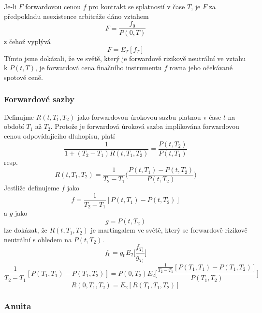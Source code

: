 \documentclass[a4paper]{book}
\begin{document}
Je-li $F$ forwardovou cenou $f$ pro kontrakt se splatností v čase $T$, je $F$ za předpokladu neexistence arbitráže dáno vztahem
\begin{equation*}
F = \frac{f_0}{P(0,T)}
\end{equation*}
z čehož vyplývá
\begin{equation*}
F = E_T[f_T]
\end{equation*}
Tímto jsme dokázali, že ve světě, který je forwardově rizikově neutrální ve vztahu k $P(t,T)$, je forwardová cena finačního instrumentu $f$ rovna jeho očekávané spotové ceně.\\

\subsubsection{Forwardové sazby}

Definujme $R(t,T_1,T_2)$ jako forwardovou úrokovou sazbu platnou v čase $t$ na období $T_1$ až $T_2$. Protože je forwardová úroková sazba implikována forwardovou cenou odpovídajícího dluhopisu, platí
\begin{equation*}
\frac{1}{1+(T_2 - T_1)R(t,T_1, T_2)}=\frac{P(t,T_2)}{P(t,T_1)}
\end{equation*}
resp.
\begin{equation*}
R(t, T_1, T_2) = \frac{1}{T_2 - T_1} \Bigg( \frac{P(t, T_1)-P(t, T_2)}{P(t, T_2)}\Bigg)
\end{equation*}
Jestliže definujeme $f$ jako
\begin{equation*}
f = \frac{1}{T_2 - T_1}[P(t,T_1) - P(t, T_2)]
\end{equation*}
a $g$ jako
\begin{equation*}
g = P(t,T_2)
\end{equation*}
lze dokázat, že $R(t,T_1,T_2)$ je martingalem ve světě, který se forwardově rizikově neutrální s ohledem na $P(t,T_2)$.
\begin{equation*}
f_0 = g_0 E_2 \Bigg[ \frac{f_{T_1}}{g_{T_1}}\Bigg]
\end{equation*}
\begin{equation*}
\frac{1}{T_2 - T_1}[P(T_1,T_1) - P(T_1, T_2)] = P(0, T_2) E_2 \Bigg[\frac{\frac{1}{T_2 - T_1}[P(T_1,T_1) - P(T_1, T_2)]}{P(T_1, T_2)}\Bigg]
\end{equation*}
\begin{equation*}
R(0,T_1,T_2) = E_2[R(T_1, T_1, T_2)]
\end{equation*}

\subsubsection{Anuita}
\end{document}
